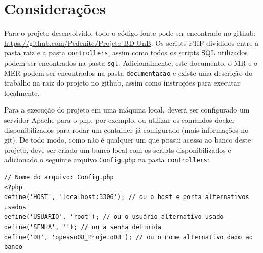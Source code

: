 \documentclass[12pt]{article}
\begin{document}
\section*{Considerações}
Para o projeto desenvolvido, todo o código-fonte pode ser encontrado no github: \url{https://github.com/Pedenite/Projeto-BD-UnB}. Os scripts PHP divididos entre a pasta raiz e a pasta \texttt{controllers}, assim como todos os scripts SQL utilizados podem ser encontrados na pasta \texttt{sql}. Adicionalmente, este documento, o MR e o MER podem ser encontrados na pasta \texttt{documentacao} e existe uma descrição do trabalho na raiz do projeto no github, assim como instruções para executar localmente.

Para a execução do projeto em uma máquina local, deverá ser configurado um servidor Apache para o php, por exemplo, ou utilizar os comandos docker disponibilizados para rodar um container já configurado (mais informações no git). De todo modo, como não é qualquer um que possui acesso ao banco deste projeto, deve ser criado um banco local com os scripts disponibilizados e adicionado o seguinte arquivo \texttt{Config.php} na pasta \texttt{controllers}:

\begin{lstlisting}
// Nome do arquivo: Config.php
<?php
define('HOST', 'localhost:3306'); // ou o host e porta alternativos usados 
define('USUARIO', 'root'); // ou o usuário alternativo usado
define('SENHA', ''); // ou a senha definida
define('DB', 'opesso08_ProjetoDB'); // ou o nome alternativo dado ao banco
\end{lstlisting}
\end{document}
